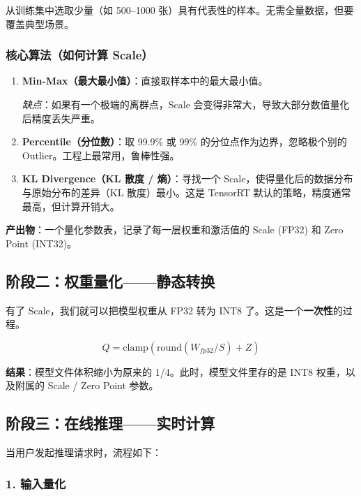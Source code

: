\documentclass[fontset=fandol,11pt,a4paper]{ctexart}
\newcommand{\keyword}[1]{\textbf{\color{Primary}#1}}
\begin{document}
从训练集中选取少量（如 500--1000 张）具有代表性的样本。无需全量数据，但要覆盖典型场景。

\subsubsection{核心算法（如何计算 Scale）}

\begin{enumerate}
  \item \keyword{Min-Max（最大最小值）}：直接取样本中的最大最小值。
  
  \textit{缺点}：如果有一个极端的离群点，Scale 会变得非常大，导致大部分数值量化后精度丢失严重。
  
  \item \keyword{Percentile（分位数）}：取 99.9\% 或 99\% 的分位点作为边界，忽略极个别的 Outlier。工程上最常用，鲁棒性强。
  
  \item \keyword{KL Divergence（KL 散度 / 熵）}：寻找一个 Scale，使得量化后的数据分布与原始分布的差异（KL 散度）最小。这是 TensorRT 默认的策略，精度通常最高，但计算开销大。
\end{enumerate}

\textbf{产出物}：一个量化参数表，记录了每一层权重和激活值的 Scale (FP32) 和 Zero Point (INT32)。

\subsection{阶段二：权重量化——静态转换}

有了 Scale，我们就可以把模型权重从 FP32 转为 INT8 了。这是一个\keyword{一次性}的过程。

\begin{mathbox}
\[
Q = \text{clamp}(\text{round}(W_{fp32} / S) + Z)
\]
\end{mathbox}

\textbf{结果}：模型文件体积缩小为原来的 1/4。此时，模型文件里存的是 INT8 权重，以及附属的 Scale / Zero Point 参数。

\subsection{阶段三：在线推理——实时计算}

当用户发起推理请求时，流程如下：

\subsubsection{1. 输入量化}
\end{document}
